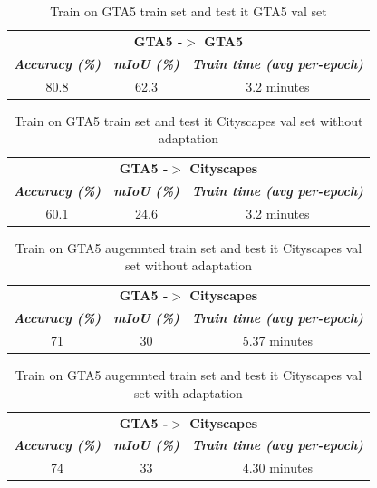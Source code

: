 \documentclass[conference]{IEEEtran}
\begin{document}
\begin{table}[tb]
\caption{Train on GTA5 train set and test it GTA5 val set}
\begin{center}
\begin{tabular}{|c|c|c|}
\hline
\multicolumn{3}{|c|}{\textbf{GTA5 -$>$ GTA5}} \\
\cline{1-3} 
\textbf{\textit{Accuracy (\%)}}& \textbf{\textit{mIoU (\%)}}& \textbf{\textit{Train time (avg per-epoch)}} \\
\hline
80.8& 62.3& 3.2 minutes   \\
\hline
\end{tabular}
\label{GTATOGTA}
\end{center}
\end{table}

\begin{table}[tb]
\caption{Train on GTA5 train set and test it Cityscapes val set without adaptation}
\begin{center}
\begin{tabular}{|c|c|c|}
\hline
\multicolumn{3}{|c|}{\textbf{GTA5 -$>$ Cityscapes}} \\
\cline{1-3} 
\textbf{\textit{Accuracy (\%)}}& \textbf{\textit{mIoU (\%)}}& \textbf{\textit{Train time (avg per-epoch)}} \\
\hline
60.1 & 24.6 & 3.2 minutes \\
\hline
\end{tabular}
\label{GTATOCITYSCAPESNOADAP}
\end{center}
\end{table}

\begin{table}[tb]
\caption{Train on GTA5 augemnted train set and test it Cityscapes val set without adaptation}
\begin{center}
\begin{tabular}{|c|c|c|}
\hline
\multicolumn{3}{|c|}{\textbf{GTA5 -$>$ Cityscapes}} \\
\cline{1-3} 
\textbf{\textit{Accuracy (\%)}}& \textbf{\textit{mIoU (\%)}}& \textbf{\textit{Train time (avg per-epoch)}} \\
\hline
71 & 30 & 5.37 minutes \\
\hline
\end{tabular}
\label{GTATOCITYSCAPESNOADAPAUG}
\end{center}
\end{table}

\begin{table}[tb]
\caption{Train on GTA5 augemnted train set and test it Cityscapes val set with adaptation}
\begin{center}
\begin{tabular}{|c|c|c|}
\hline
\multicolumn{3}{|c|}{\textbf{GTA5 -$>$ Cityscapes}} \\
\cline{1-3} 
\textbf{\textit{Accuracy (\%)}}& \textbf{\textit{mIoU (\%)}}& \textbf{\textit{Train time (avg per-epoch)}} \\
\hline
74 & 33 & 4.30 minutes \\
\hline
\end{tabular}
\label{GTATOCITYSCAPESADAP}
\end{center}
\end{table}
\end{document}
